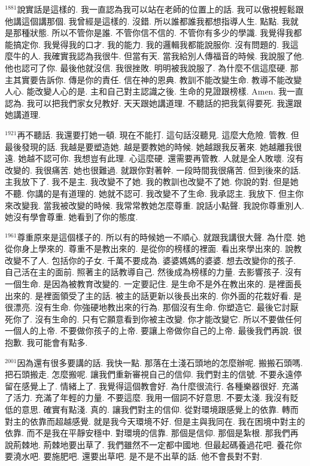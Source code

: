 \documentclass{book}
\begin{document}
$^{1881}$說實話是這樣的.
我一直認為我可以站在老師的位置上的話.
我可以傲視輕鬆跟他講這個講那個.
我曾經是這樣的.
沒錯.
所以誰都誰我都想指導人生.
點點.
我就是那種狀態.
所以不管你是誰.
不管你信不信的.
不管你有多少的學識.
我覺得我都能搞定你.
我覺得我的口才.
我的能力.
我的邏輯我都能說服你.
沒有問題的.
我這麼牛的人.
我確實我認為我很牛.
但當有天.
當我給別人傳福音的時候.
我說服了他.
他也認可了你.
最後他就沒信.
我很挫敗.
明明被我說服了.
為什麼不信這麼硬.
那主其實要告訴你.
傳是你的責任.
信在神的恩典.
教訓不能改變生命.
教導不能改變人心.
能改變人心的是.
主和自己對主認識之後.
生命的見證跟榜樣.
Amen.
我一直認為.
我可以把我們家女兒教好.
天天跟她講道理.
不聽話的把我氣得要死.
我還跟她講道理.

$^{1921}$再不聽話.
我還要打她一頓.
現在不能打.
這句話沒聽見.
這麼大危險.
管教.
但最後發現的話.
我越是要塑造她.
越是要教她的時候.
她越跟我反著來.
她越離我很遠.
她越不認可你.
我想豈有此理.
心這麼硬.
還需要再管教.
人就是全人敗壞.
沒有改變的.
我很痛苦.
她也很難過.
就跟你對著幹.
一段時間我很痛苦.
但到後來的話.
主我放下了.
我不是主.
我改變不了她.
我的教訓也改變不了她.
你說的對.
但是她不聽.
你講的是有道理的.
她就不認可.
我改變不了生命.
我承認主.
我放下.
但主你來改變我.
當我被改變的時候.
我常常教她怎麼尊重.
說話小點聲.
我說你尊重別人.
她沒有學會尊重.
她看到了你的態度.

$^{1961}$尊重原來是這個樣子的.
所以有的時候她一不順心.
就跟我講很大聲.
為什麼.
她從你身上學來的.
尊重不是教出來的.
是從你的榜樣的裡面.
看出來學出來的.
說教改變不了人.
包括你的子女.
千萬不要成為.
婆婆媽媽的婆婆.
想去改變你的孩子.
自己活在主的面前.
照著主的話教導自己.
然後成為榜樣的力量.
去影響孩子.
沒有一個生命.
是因為被教育改變的.
一定要記住.
是生命不是外在教出來的.
是裡面長出來的.
是裡面領受了主的話.
被主的話更新以後長出來的.
你外面的花栽好看.
是很漂亮.
沒有生命.
你強硬地教出來的行為.
那個沒有生命.
你塑造它.
最後它討厭死你了.
沒有生命的.
只有它願意看到你被主改變.
你才能改變它.
所以不要做任何一個人的上帝.
不要做你孩子的上帝.
要讓上帝做你自己的上帝.
最後我們再說.
很抱歉.
我可能會有點多.

$^{2001}$因為還有很多要講的話.
我快一點.
那落在土淺石頭地的怎麼辦呢.
搬搬石頭嗎.
把石頭搬走.
怎麼搬呢.
讓我們重新審視自己的信仰.
我們對主的信號.
不要永遠停留在感覺上了.
情緒上了.
我覺得這個教會好.
為什麼很流行.
各種樂器很好.
充滿了活力.
充滿了年輕的力量.
不要這麼.
我用一個詞不好意思.
不要太淺.
我沒有貶低的意思.
確實有點淺.
真的.
讓我們對主的信仰.
從對環境跟感覺上的依靠.
轉而對主的依靠而超越感覺.
就是我今天環境不好.
但是主與我同在.
我在困境中對主的依靠.
而不是我在平靜安穩中.
對環境的信靠.
那個是信仰.
那個是紮根.
那我們再說荊棘地.
荊棘地要出草了.
我們雖然不一定都中國地.
但最起碼養過花吧.
養花你要澆水吧.
要施肥吧.
還要出草吧.
是不是不出草的話.
他不會長對不對.
\end{document}
